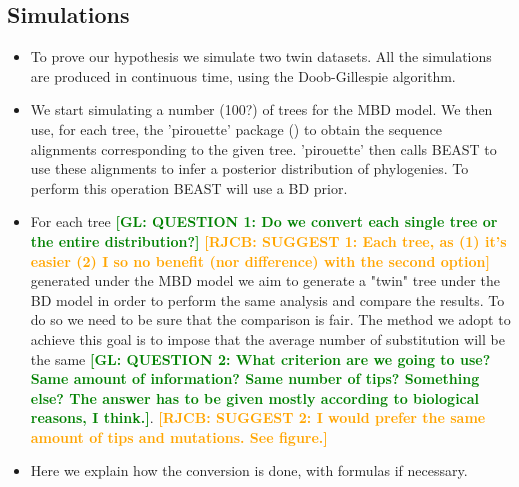 \documentclass{article}
\newcommand*\richel[1]{\textcolor{orange}{\textbf{[RJCB: #1]}}}
\newcommand*\gio[1]{\textcolor{green}{\textbf{[GL: #1]}}}
\begin{document}
\subsection{Simulations}
\begin{itemize}

\item To prove our hypothesis we simulate two twin datasets. All the simulations are produced in continuous time, using the Doob-Gillespie algorithm. 

\item We start simulating a number (100?) of trees for the MBD model. We then use, for each tree, the 'pirouette' package (\cite{pirouette}) to obtain the sequence alignments corresponding to the given tree. 'pirouette' then calls BEAST to use these alignments to infer a posterior distribution of phylogenies. To perform this operation BEAST will use a BD prior.

\item For each tree 
\gio{QUESTION 1: Do we convert each single tree or the entire distribution?} 
\richel{SUGGEST 1: Each tree, as (1) it's easier (2) I so no benefit (nor difference) with the second option} 
generated under the MBD model we aim to generate a "twin" tree under the BD model in order to perform the same analysis and compare the results. To do so we need to be sure that the comparison is fair. The method we adopt to achieve this goal is to impose that the average number of substitution will be the same 
\gio{QUESTION 2: What criterion are we going to use? Same amount of information? Same number of tips? Something else? The answer has to be given mostly according to biological reasons, I think.}.
\richel{SUGGEST 2: I would prefer the same amount of tips and mutations. See figure.}
\item Here we explain how the conversion is done, with formulas if necessary.


\end{itemize}
\end{document}
